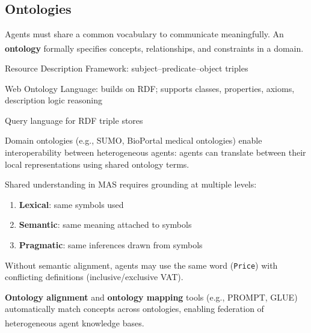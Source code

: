 \subsection{Ontologies}
\begin{tcbitemize}[ skin=sectionraster ]

    \tcbitem[title=Ontologies in MAS, raster multicolumn=3]
    Agents must share a common vocabulary to communicate meaningfully.
    An \textbf{ontology} formally specifies concepts, relationships, and
    constraints in a domain.\textsuperscript{\cite[][p.~198]{wooldridgeIntroductionMultiAgentSystems2009}}

    \begin{description}[leftmargin=0.6cm, labelindent=0pt]
        \item[\textbf{RDF}] Resource Description Framework: subject--predicate--object triples
        \item[\textbf{OWL}] Web Ontology Language: builds on RDF; supports classes, properties,
              axioms, description logic reasoning
        \item[\textbf{SPARQL}] Query language for RDF triple stores
    \end{description}
    Domain ontologies (e.g., SUMO, BioPortal medical ontologies) enable
    interoperability between heterogeneous agents: agents can translate
    between their local representations using shared ontology terms.

    \tcbitem[title=Knowledge Representation Levels, raster multicolumn=3]
    Shared understanding in MAS requires grounding at multiple levels:
    \begin{enumerate}
        \item \textbf{Lexical}: same symbols used
        \item \textbf{Semantic}: same meaning attached to symbols
        \item \textbf{Pragmatic}: same inferences drawn from symbols
    \end{enumerate}
    Without semantic alignment, agents may use the same word (\texttt{Price})
    with conflicting definitions (inclusive/exclusive VAT).

    \textbf{Ontology alignment} and \textbf{ontology mapping} tools (e.g., PROMPT,
    GLUE) automatically match concepts across ontologies, enabling federation
    of heterogeneous agent knowledge
    bases.\textsuperscript{\cite[][p.~201]{weissMultiagentSystems2013}}

\end{tcbitemize}

